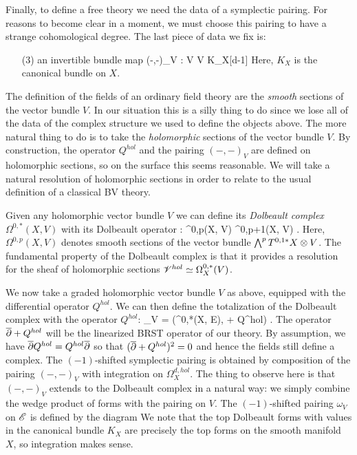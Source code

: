 Finally, to define a free theory we need the data of a symplectic pairing. 
For reasons to become clear in a moment, we must choose this pairing to have a strange cohomological degree. 
The last piece of data we fix is:
\begin{itemize}
\item[(3)] an invertible bundle map
\ben
(-,-)_V : V \tensor V \to K_X[d-1]
\een
Here, $K_X$ is the canonical bundle on $X$. 
\end{itemize}

The definition of the fields of an ordinary field theory are the {\em smooth} sections of the vector bundle $V$. 
In our situation this is a silly thing to do since we lose all of the data of the complex structure we used to define the objects above.
The more natural thing to do is to take the {\em holomorphic} sections of the vector bundle $V$. 
By construction, the operator $Q^{hol}$ and the pairing $(-,-)_V$ are defined on holomorphic sections, so on the surface this seems reasonable.
We will take a natural resolution of holomorphic sections in order to relate to the usual definition of a classical BV theory.

Given any holomorphic vector bundle $V$ we can define its {\em Dolbeault complex} $\Omega^{0,*}(X , V)$ with its Dolbeault operator 
\ben
\dbar : \Omega^{0,p}(X, V) \to \Omega^{0,p+1}(X, V) .
\een
Here, $\Omega^{0,p}(X, V)$ denotes smooth sections of the vector bundle $\bigwedge^p T^{0,1*} X \otimes V$. 
The fundamental property of the Dolbeault complex is that it provides a resolution for the sheaf of holomorphic sections $\mathscr V^{hol} \simeq \Omega^{0,*}_X(V)$. 

We now take a graded holomorphic vector bundle $V$ as above, equipped with the differential operator $Q^{hol}$. 
We can then define the totalization of the Dolbeault complex with the operator $Q^{hol}$:
\ben
\sE_V = \left(\Omega^{0,*}(X, E), \dbar + Q^{hol}\right) .
\een
The operator $\overline{\partial} + Q^{hol}$ will be the linearized BRST operator of our theory.
By assumption, we have $\overline{\partial} Q^{hol} = Q^{hol} \overline{\partial}$ so that $(\overline{\partial} + Q^{hol})^2 = 0$ and hence the fields still define a complex. 
The $(-1)$-shifted symplectic pairing is obtained by composition of the pairing $(-,-)_V$ with integration on $\Omega^{d,hol}_X$. 
The thing to observe here is that $(-,-)_V$ extends to the Dolbeault complex in a natural way: we simply combine the wedge product of forms with the pairing on $V$.
The $(-1)$-shifted pairing $\omega_V$ on $\mathscr E$ is defined by the diagram
\ben
{}
\een
We note that the top Dolbeault forms with values in the canonical bundle $K_X$ are precisely the top forms on the smooth manifold $X$, so integration makes sense. 

